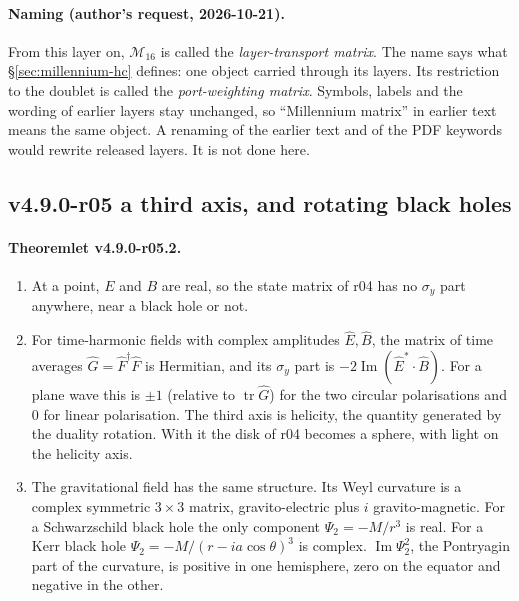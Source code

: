 \paragraph{Naming (author's request, 2026-10-21).}
From this layer on, \(\mathcal M_{16}\) is called the \emph{layer-transport matrix}.  The name says what
\S\ref{sec:millennium-hc} defines: one object carried through its layers.  Its restriction to the doublet is called the
\emph{port-weighting matrix}.  Symbols, labels and the wording of earlier layers stay unchanged, so ``Millennium matrix''
in earlier text means the same object.  A renaming of the earlier text and of the PDF keywords would rewrite released
layers.  It is not done here.

\subsection*{v4.9.0-r05 a third axis, and rotating black holes}
\label{subsec:v490-r05-third-axis}

\paragraph{Theoremlet v4.9.0-r05.2.}
\begin{enumerate}[leftmargin=2em]
\item[(a)] At a point, \(E\) and \(B\) are real, so the state matrix of r04 has no \(\sigma_y\) part anywhere, near a black
hole or not.
\item[(b)] For time-harmonic fields with complex amplitudes \(\hat E,\hat B\), the matrix of time averages
\(\hat G=\hat F^\dagger\hat F\) is Hermitian, and its \(\sigma_y\) part is \(-2\operatorname{Im}(\hat E^*\cdot\hat B)\).  For a plane
wave this is \(\pm1\) (relative to \(\operatorname{tr}\hat G\)) for the two circular polarisations and \(0\) for linear
polarisation.  The third axis is helicity, the quantity generated by the duality rotation.  With it the disk of r04
becomes a sphere, with light on the helicity axis.
\item[(c)] The gravitational field has the same structure.  Its Weyl curvature is a complex symmetric \(3\times3\) matrix,
gravito-electric plus \(i\) gravito-magnetic.  For a Schwarzschild black hole the only component
\(\Psi_2=-M/r^3\) is real.  For a Kerr black hole \(\Psi_2=-M/(r-ia\cos\theta)^3\) is complex.  \(\operatorname{Im}\Psi_2^2\), the
Pontryagin part of the curvature, is positive in one hemisphere, zero on the equator and negative in the other.
\end{enumerate}

